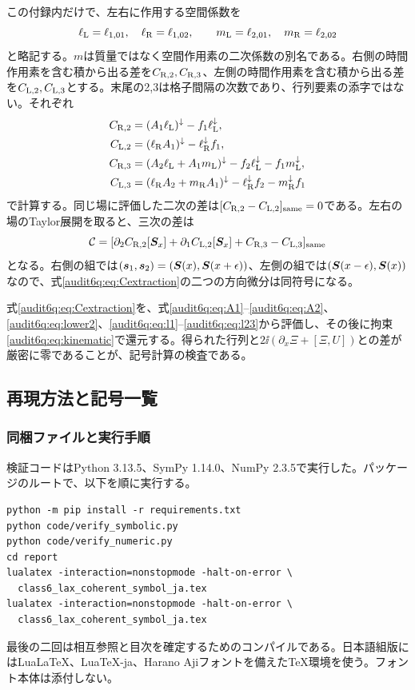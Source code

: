 この付録内だけで、左右に作用する空間係数を
\begin{equation}
\ell_{\rm L}=\ell_{1,01},\quad\ell_{\rm R}=\ell_{1,02},\qquad
m_{\rm L}=\ell_{2,01},\quad m_{\rm R}=\ell_{2,02}
\label{audit6q:eq:appendixaliases}
\end{equation}
と略記する。$m$は質量ではなく空間作用素の二次係数の別名である。右側の時間作用素を含む積から出る差を$C_{{\rm R},2},C_{{\rm R},3}$、左側の時間作用素を含む積から出る差を$C_{{\rm L},2},C_{{\rm L},3}$とする。末尾の2,3は格子間隔の次数であり、行列要素の添字ではない。それぞれ
\begin{align}
C_{{\rm R},2}&=(A_1\ell_{\rm L})^\downarrow-f_1\ell_{\rm L}^\downarrow,
\nonumber\\
C_{{\rm L},2}&=(\ell_{\rm R}A_1)^\downarrow-\ell_{\rm R}^\downarrow f_1,
\label{audit6q:eq:C2}\\
C_{{\rm R},3}&=(A_2\ell_{\rm L}+A_1m_{\rm L})^\downarrow
-f_2\ell_{\rm L}^\downarrow-f_1m_{\rm L}^\downarrow,
\nonumber\\
C_{{\rm L},3}&=(\ell_{\rm R}A_2+m_{\rm R}A_1)^\downarrow
-\ell_{\rm R}^\downarrow f_2-m_{\rm R}^\downarrow f_1
\label{audit6q:eq:C3}
\end{align}
で計算する。同じ場に評価した二次の差は$[C_{{\rm R},2}-C_{{\rm L},2}]_{\rm same}=0$である。左右の場のTaylor展開を取ると、三次の差は
\begin{equation}
\mathcal C=
[\partial_2C_{{\rm R},2}[\boldsymbol S_x]
+\partial_1C_{{\rm L},2}[\boldsymbol S_x]
+C_{{\rm R},3}-C_{{\rm L},3}]_{\rm same}
\label{audit6q:eq:Cextraction}
\end{equation}
となる。右側の組では$(\boldsymbol s_1,\boldsymbol s_2)=(\boldsymbol S(x),\boldsymbol S(x+\epsilon))$、左側の組では$(\boldsymbol S(x-\epsilon),\boldsymbol S(x))$なので、式\eqref{audit6q:eq:Cextraction}の二つの方向微分は同符号になる。

式\eqref{audit6q:eq:Cextraction}を、式\eqref{audit6q:eq:A1}--\eqref{audit6q:eq:A2}、\eqref{audit6q:eq:lower2}、\eqref{audit6q:eq:l1}--\eqref{audit6q:eq:l23}から評価し、その後に拘束\eqref{audit6q:eq:kinematic}で還元する。得られた行列と$2\ii(\partial_x\Xi+[\Xi,U])$との差が厳密に零であることが、記号計算の検査である。

\subsection{再現方法と記号一覧}
\subsubsection{同梱ファイルと実行手順}
検証コードはPython 3.13.5、SymPy 1.14.0、NumPy 2.3.5で実行した。パッケージのルートで、以下を順に実行する。
\begin{verbatim}
python -m pip install -r requirements.txt
python code/verify_symbolic.py
python code/verify_numeric.py
cd report
lualatex -interaction=nonstopmode -halt-on-error \
  class6_lax_coherent_symbol_ja.tex
lualatex -interaction=nonstopmode -halt-on-error \
  class6_lax_coherent_symbol_ja.tex
\end{verbatim}
最後の二回は相互参照と目次を確定するためのコンパイルである。日本語組版にはLuaLaTeX、LuaTeX-ja、Harano Ajiフォントを備えたTeX環境を使う。フォント本体は添付しない。

